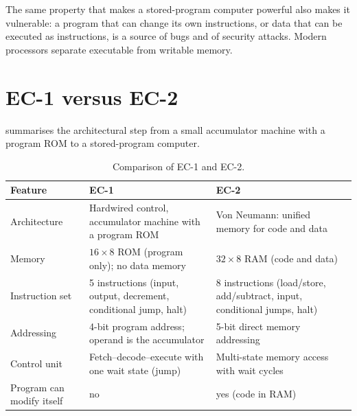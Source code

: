 \begin{caution}
The same property that makes a stored-program computer powerful also makes it vulnerable: a program that can change its own instructions, or data that can be executed as instructions, is a source of bugs and of security attacks. Modern processors separate executable from writable memory.
\end{caution}

\section{EC-1 versus EC-2}
 summarises the architectural step from a small accumulator machine with a program ROM to a stored-program computer.

\begin{table}[htbp]
\centering
\small
\caption{Comparison of EC-1 and EC-2.}
\label{tab:ec1-ec2}
\begin{tabularx}{\linewidth}{@{}lXX@{}}
\toprule
Feature & EC-1 & EC-2\\ \midrule
Architecture & Hardwired control, accumulator machine with a program ROM & Von Neumann: unified memory for code and data\\
Memory & $16\times8$ ROM (program only); no data memory & $32\times8$ RAM (code and data)\\
Instruction set & 5 instructions (input, output, decrement, conditional jump, halt) & 8 instructions (load/store, add/subtract, input, conditional jumps, halt)\\
Addressing & 4-bit program address; operand is the accumulator & 5-bit direct memory addressing\\
Control unit & Fetch--decode--execute with one wait state (jump) & Multi-state memory access with wait cycles\\
Program can modify itself & no & yes (code in RAM)\\ \bottomrule
\end{tabularx}
\end{table}


